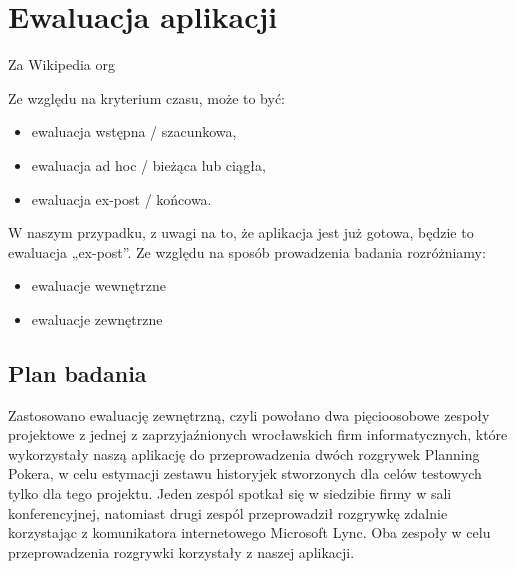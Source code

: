 ﻿\chapter{Ewaluacja aplikacji}

Za Wikipedia org 
\begin{quote}
\end{quote}
Ze względu na kryterium czasu, może to być:
\begin{itemize}
	\item ewaluacja wstępna / szacunkowa,
	\item ewaluacja ad hoc / bieżąca lub ciągła,
	\item ewaluacja ex-post / końcowa.
\end{itemize}
W naszym przypadku, z uwagi na to, że aplikacja jest już gotowa, będzie to ewaluacja „ex-post”. \newline
Ze względu na sposób prowadzenia badania rozróżniamy:
\begin{itemize}
	\item ewaluacje wewnętrzne
	\item ewaluacje zewnętrzne
\end{itemize}

\section{Plan badania}
Zastosowano ewaluację zewnętrzną, czyli powołano dwa pięcioosobowe zespoły projektowe z
jednej z zaprzyjaźnionych wrocławskich firm informatycznych, które wykorzystały naszą aplikację do
przeprowadzenia dwóch rozgrywek Planning Pokera, w celu estymacji zestawu historyjek stworzonych dla
celów testowych tylko dla tego projektu. Jeden zespól spotkał się w siedzibie firmy w sali konferencyjnej,
natomiast drugi zespól przeprowadził rozgrywkę zdalnie korzystając z komunikatora internetowego Microsoft
Lync. Oba zespoły w celu przeprowadzenia rozgrywki korzystały z naszej aplikacji.
